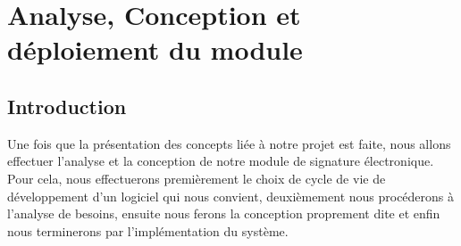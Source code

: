 \chapter{Analyse, Conception et déploiement du module}

	\section*{Introduction}
		Une fois que la présentation des concepts liée à notre projet est faite, nous allons effectuer l'analyse et la conception de notre module de signature électronique. Pour cela, nous effectuerons premièrement le choix de cycle de vie de développement d'un logiciel qui nous convient, deuxièmement nous procéderons à l'analyse de besoins, ensuite nous ferons la conception proprement dite et enfin nous terminerons par l'implémentation du système.
	
